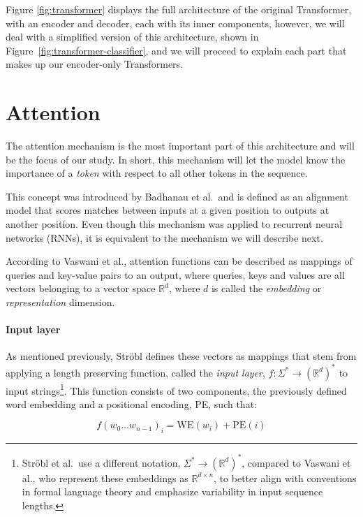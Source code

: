 Figure \ref{fig:transformer} displays the full architecture of the original Transformer, with an encoder and decoder, each with its inner components, however, we will deal with a simplified version of this architecture, shown in Figure~\ref{fig:transformer-classifier}, and we will proceed to explain each part that makes up our encoder-only Transformers.

\section{Attention} \label{section:attention}
The attention mechanism is the most important part of this architecture and will be the focus of our study. In short, this mechanism will let the model know the importance of a \emph{token} with respect to all other tokens in the sequence.

This concept was introduced by Badhanau et al.\ and is defined as an alignment model \cite{badhanau-attn} that scores matches between inputs at a given position to outputs at another position. Even though this mechanism was applied to recurrent neural networks (RNNs), it is equivalent to the mechanism we will describe next.

According to Vaswani et al., attention functions can be described as mappings of queries and key-value pairs to an output, where queries, keys and values are all vectors belonging to a vector space $\mathbb{R}^d$, where $d$ is called the \emph{embedding} or \emph{representation} dimension. 

\paragraph{Input layer}
As mentioned previously, Ströbl defines these vectors as mappings that stem from applying a length preserving function, called the \emph{input layer}, $f: \Sigma^* \rightarrow (\mathbb{R}^d)^*$ to input strings\footnote{Ströbl et al.~use a different notation, $\Sigma^* \rightarrow (\mathbb{R}^d)^*$, compared to Vaswani et al., who represent these embeddings as $\mathbb{R}^{d\times n}$, to better align with conventions in formal language theory and emphasize variability in input sequence lengths.}. This function consists of two components, the previously defined word embedding and a positional encoding, PE, such that:

\begin{equation} \label{eq:input_layer}
    f(w_0\dots w_{n-1})_i = \text{WE}(w_i) +\text{PE}(i)
\end{equation}

